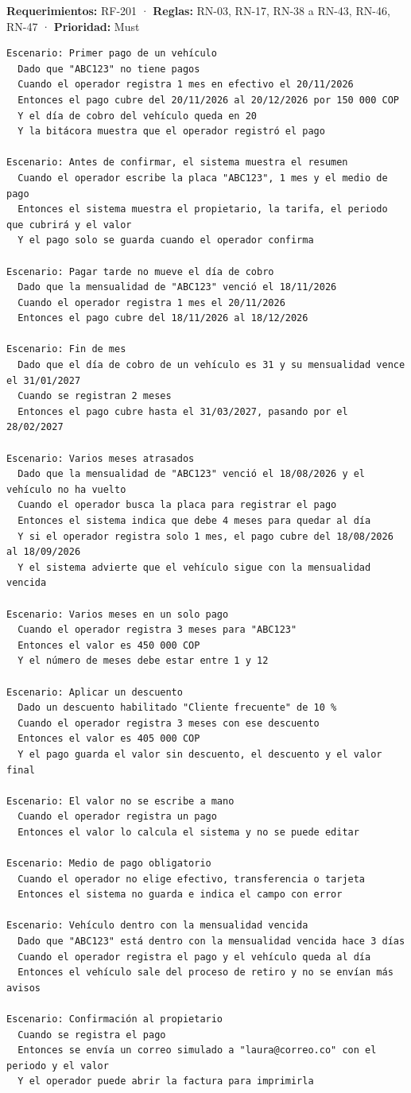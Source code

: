 \textbf{Requerimientos:} RF-201 · \textbf{Reglas:} RN-03, RN-17, RN-38 a RN-43, RN-46, RN-47 · \textbf{Prioridad:} Must


\begin{lstlisting}[style=gherkin]
Escenario: Primer pago de un vehículo
  Dado que "ABC123" no tiene pagos
  Cuando el operador registra 1 mes en efectivo el 20/11/2026
  Entonces el pago cubre del 20/11/2026 al 20/12/2026 por 150 000 COP
  Y el día de cobro del vehículo queda en 20
  Y la bitácora muestra que el operador registró el pago

Escenario: Antes de confirmar, el sistema muestra el resumen
  Cuando el operador escribe la placa "ABC123", 1 mes y el medio de pago
  Entonces el sistema muestra el propietario, la tarifa, el periodo que cubrirá y el valor
  Y el pago solo se guarda cuando el operador confirma

Escenario: Pagar tarde no mueve el día de cobro
  Dado que la mensualidad de "ABC123" venció el 18/11/2026
  Cuando el operador registra 1 mes el 20/11/2026
  Entonces el pago cubre del 18/11/2026 al 18/12/2026

Escenario: Fin de mes
  Dado que el día de cobro de un vehículo es 31 y su mensualidad vence el 31/01/2027
  Cuando se registran 2 meses
  Entonces el pago cubre hasta el 31/03/2027, pasando por el 28/02/2027

Escenario: Varios meses atrasados
  Dado que la mensualidad de "ABC123" venció el 18/08/2026 y el vehículo no ha vuelto
  Cuando el operador busca la placa para registrar el pago
  Entonces el sistema indica que debe 4 meses para quedar al día
  Y si el operador registra solo 1 mes, el pago cubre del 18/08/2026 al 18/09/2026
  Y el sistema advierte que el vehículo sigue con la mensualidad vencida

Escenario: Varios meses en un solo pago
  Cuando el operador registra 3 meses para "ABC123"
  Entonces el valor es 450 000 COP
  Y el número de meses debe estar entre 1 y 12

Escenario: Aplicar un descuento
  Dado un descuento habilitado "Cliente frecuente" de 10 %
  Cuando el operador registra 3 meses con ese descuento
  Entonces el valor es 405 000 COP
  Y el pago guarda el valor sin descuento, el descuento y el valor final

Escenario: El valor no se escribe a mano
  Cuando el operador registra un pago
  Entonces el valor lo calcula el sistema y no se puede editar

Escenario: Medio de pago obligatorio
  Cuando el operador no elige efectivo, transferencia o tarjeta
  Entonces el sistema no guarda e indica el campo con error

Escenario: Vehículo dentro con la mensualidad vencida
  Dado que "ABC123" está dentro con la mensualidad vencida hace 3 días
  Cuando el operador registra el pago y el vehículo queda al día
  Entonces el vehículo sale del proceso de retiro y no se envían más avisos

Escenario: Confirmación al propietario
  Cuando se registra el pago
  Entonces se envía un correo simulado a "laura@correo.co" con el periodo y el valor
  Y el operador puede abrir la factura para imprimirla
\end{lstlisting}




